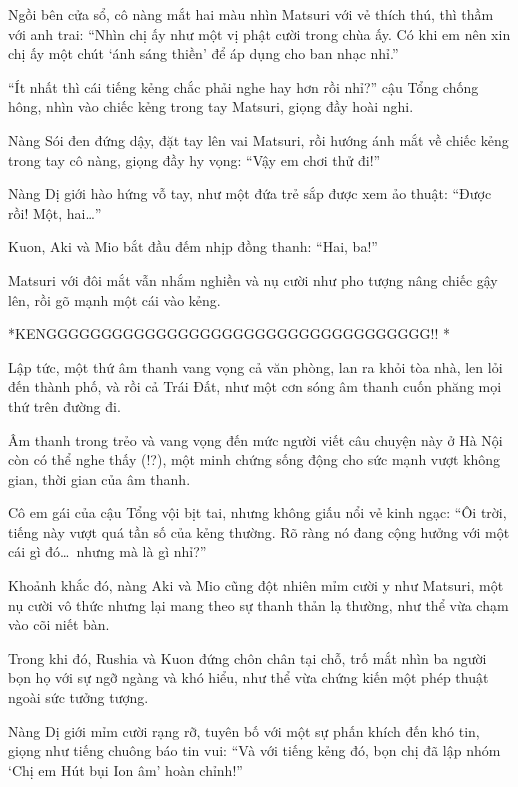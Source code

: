 \documentclass[../main.tex]{subfiles}
\begin{document}
Ngồi bên cửa sổ, cô nàng mắt hai màu nhìn Matsuri với vẻ thích thú, thì thầm với anh trai: ``Nhìn chị ấy như một vị phật cười trong chùa ấy. Có khi em nên xin chị ấy một chút `ánh sáng thiền' để áp dụng cho ban nhạc nhỉ.''

``Ít nhất thì cái tiếng kẻng chắc phải nghe hay hơn rồi nhỉ?'' cậu Tổng chống hông, nhìn vào chiếc kẻng trong tay Matsuri, giọng đầy hoài nghi.

Nàng Sói đen đứng dậy, đặt tay lên vai Matsuri, rồi hướng ánh mắt về chiếc kẻng trong tay cô nàng, giọng đầy hy vọng: ``Vậy em chơi thử đi!''

Nàng Dị giới hào hứng vỗ tay, như một đứa trẻ sắp được xem ảo thuật: ``Được rồi! Một, hai\dots''

Kuon, Aki và Mio bắt đầu đếm nhịp đồng thanh: ``Hai, ba!''

Matsuri với đôi mắt vẫn nhắm nghiền và nụ cười như pho tượng nâng chiếc gậy lên, rồi gõ mạnh một cái vào kẻng.

*KENGGGGGGGGGGGGGGGGGGGGGGGGGGGGGGGGGGG!! *


Lập tức, một thứ âm thanh vang vọng cả văn phòng, lan ra khỏi tòa nhà, len lỏi đến thành phố, và rồi cả Trái Đất, như một cơn sóng âm thanh cuốn phăng mọi thứ trên đường đi.

Âm thanh trong trẻo và vang vọng đến mức người viết câu chuyện này ở Hà Nội còn có thể nghe thấy (!?), một minh chứng sống động cho sức mạnh vượt không gian, thời gian của âm thanh.

Cô em gái của cậu Tổng vội bịt tai, nhưng không giấu nổi vẻ kinh ngạc: ``Ôi trời, tiếng này vượt quá tần số của kẻng thường. Rõ ràng nó đang cộng hưởng với một cái gì đó\dots\ nhưng mà là gì nhỉ?''

\ct

Khoảnh khắc đó, nàng Aki và Mio cũng đột nhiên mỉm cười y như Matsuri, một nụ cười vô thức nhưng lại mang theo sự thanh thản lạ thường, như thể vừa chạm vào cõi niết bàn.


Trong khi đó, Rushia và Kuon đứng chôn chân tại chỗ, trố mắt nhìn ba người bọn họ với sự ngỡ ngàng và khó hiểu, như thể vừa chứng kiến một phép thuật ngoài sức tưởng tượng.

Nàng Dị giới mỉm cười rạng rỡ, tuyên bố với một sự phấn khích đến khó tin, giọng như tiếng chuông báo tin vui: ``Và với tiếng kẻng đó, bọn chị đã lập nhóm `Chị em Hút bụi Ion âm' hoàn chỉnh!''
\end{document}
